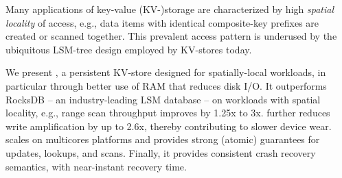 Many applications of key-value (KV-)storage  are characterized by high \emph{spatial locality}
of access, e.g., data items with identical composite-key prefixes are created or scanned together.  
This prevalent access pattern is underused by the ubiquitous LSM-tree design employed by KV-stores today.

We present \sys, a persistent KV-store designed for spatially-local workloads, in particular through better use of RAM
that reduces disk I/O.  It outperforms RocksDB -- an industry-leading LSM database -- on workloads with spatial locality, e.g.,  range scan throughput
improves by 1.25x to 3x. \sys\/ further reduces write amplification 
by up to 2.6x, thereby contributing to slower device wear. \sys\/ scales on multicores platforms and provides strong (atomic) guarantees for updates, lookups, and scans. Finally, it provides consistent crash recovery semantics, with near-instant recovery time. 